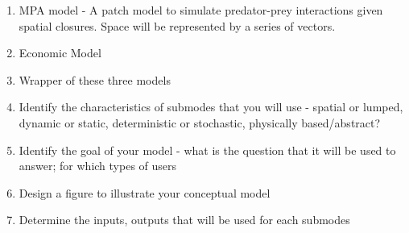 \documentclass[]{article}
\begin{document}
\begin{enumerate}
\def\labelenumi{\arabic{enumi}.}
\setcounter{enumi}{1}
\item
  MPA model - A patch model to simulate predator-prey interactions given
  spatial closures. Space will be represented by a series of vectors.
\item
  Economic Model
\item
  Wrapper of these three models
\item
  Identify the characteristics of submodes that you will use - spatial
  or lumped, dynamic or static, deterministic or stochastic, physically
  based/abstract?
\item
  Identify the goal of your model - what is the question that it will be
  used to answer; for which types of users
\item
  Design a figure to illustrate your conceptual model
\item
  Determine the inputs, outputs that will be used for each submodes
\end{enumerate}
\end{document}
